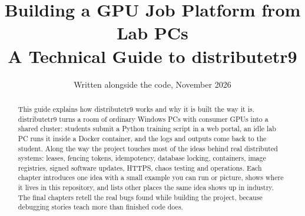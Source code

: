 \documentclass[11pt]{article}
\title{Building a GPU Job Platform from Lab PCs\\
A Technical Guide to distributetr9}
\author{Written alongside the code, November 2026}
\date{}
\begin{document}
\maketitle

\begin{abstract}
This guide explains how distributetr9 works and why it is built the way it
is. distributetr9 turns a room of ordinary Windows PCs with consumer GPUs into
a shared cluster: students submit a Python training script in a web portal, an
idle lab PC runs it inside a Docker container, and the logs and outputs come
back to the student. Along the way the project touches most of the ideas behind
real distributed systems: leases, fencing tokens, idempotency, database
locking, containers, image registries, signed software updates, HTTPS, chaos
testing and operations. Each chapter introduces one idea with a small example
you can run or picture, shows where it lives in this repository, and lists
other places the same idea shows up in industry. The final chapters retell the
real bugs found while building the project, because debugging stories teach
more than finished code does.
\end{abstract}


















\end{document}
